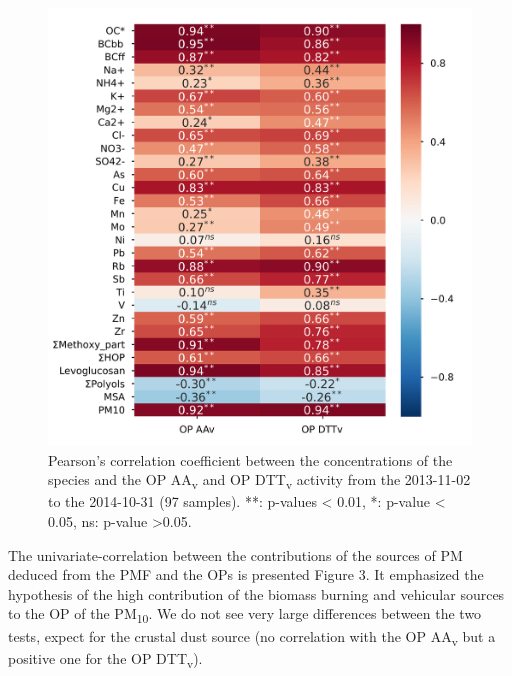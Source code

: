 \documentclass[12pt]{article}
\begin{document}
\begin{figure}[h]
    \centering
    \includegraphics{figures/SI_fig02}
    \caption{Pearson's correlation coefficient between the concentrations of the
        species and the OP AA\textsubscript{v} and OP DTT\textsubscript{v}
        activity from the 2013-11-02 to the 2014-10-31 (97 samples). **:
        p-values \textless{} 0.01, *: p-value \textless{} 0.05, ns: p-value
    \textgreater{}0.05.}
    \label{fig:pearsonrChem}
\end{figure}

The univariate-correlation between the contributions of the sources of
PM deduced from the PMF and the OPs is presented Figure 3. It emphasized
the hypothesis of the high contribution of the biomass burning and
vehicular sources to the OP of the PM\textsubscript{10}. We do not see
very large differences between the two tests, expect for the crustal
dust source (no correlation with the OP AA\textsubscript{v} but a
positive one for the OP DTT\textsubscript{v}).
\end{document}
